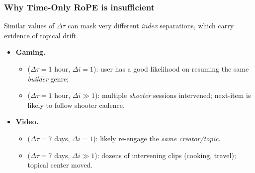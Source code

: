 \documentclass[sigconf]{acmart}
\begin{document}
\subsubsection*{Why Time-Only RoPE is insufficient}


Similar values of $\Delta\tau$ can mask very different \emph{index} separations, which carry evidence of topical drift.
\begin{itemize}
\item \textbf{Gaming.}
\begin{itemize}
\item  ($\Delta\tau{=}1$ hour, $\Delta i{=}1$): user has a good likelihood on resuming the same \emph{builder} genre;
\item  ($\Delta\tau{=}1$ hour, $\Delta i\gg 1$): multiple \emph{shooter} sessions intervened; next-item is likely to follow shooter cadence.
\end{itemize}

\item \textbf{Video.}
\begin{itemize}
\item  ($\Delta\tau{=}7$ days, $\Delta i{=}1$): likely re-engage the \emph{same creator/topic}.
\item  ($\Delta\tau{=}7$ days, $\Delta i\gg 1$): dozens of intervening clips (cooking, travel); topical center moved.
\end{itemize}

\end{itemize}
\end{document}
